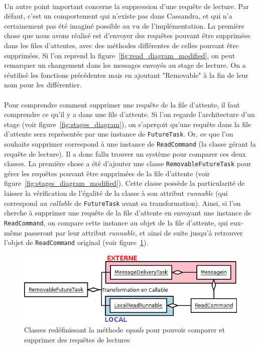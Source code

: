 \documentclass[12pt]{article}
\newcommand{\class}[1]{\texttt{#1}}
\begin{document}
\paragraph{}Un autre point important concerne la suppression d'une requête de lecture. Par défaut, c'est un comportement qui n'existe pas dans Cassandra, et qui n'a certainement pas été imaginé possible au vu de l'implémentation. La première chose que nous avons réalisé est d'envoyer des requêtes pouvant être supprimées dans les files d'attentes, avec des méthodes différentes de celles pouvant être supprimées. Si l'on reprend la figure~\ref{fig:read_diagram_modified}, on peut remarquer un changement dans les messages envoyés au stage de lecture. On a réutilisé les fonctions précédentes mais en ajoutant "Removable" à la fin de leur nom pour les différentier.

\paragraph{}Pour comprendre comment supprimer une requête de la file d'attente, il faut comprendre ce qu'il y a dans une file d'attente. Si l'on regarde l'architecture d'un stage (voir figure~\ref{fig:stages_diagram}), on s'aperçoit qu'une requête dans la file d'attente sera représentée par une instance de \class{FutureTask}. Or, ce que l'on souhaite supprimer correspond à une instance de \class{ReadCommand} (la classe gérant la requête de lecture). Il a donc fallu trouver un système pour comparer ces deux classes. La première chose a été d'ajouter une classe \class{RemovableFutureTask} pour gérer les requêtes pouvant être supprimées de la file d'attente (voir figure~\ref{fig:stages_diagram_modified}). Cette classe possède la particularité de laisser la vérification de l'égalité de la classe à son attribut \textit{runnable} (qui correspond au \textit{callable} de \class{FutureTask} avant sa transformation). Ainsi, si l'on cherche à supprimer une requête de la file d'attente en envoyant une instance de \class{ReadCommand}, on compare cette instance au objet de la file d'attente, qui eux-même passeront par leur attribut \textit{runnable}, et ainsi de suite jusqu'à retrouver l'objet de \class{ReadCommand} original (voir figure~\ref{fig:remove_request_diagram}).

\begin{figure}[!h]
	\centering
        \includegraphics[width=13cm]{images/implementation/remove_request_diagram.png}
    \caption{Classes redéfinissant la méthode \textit{equals} pour pouvoir comparer et supprimer des requêtes de lectures \label{fig:remove_request_diagram}}
\end{figure}
\end{document}
